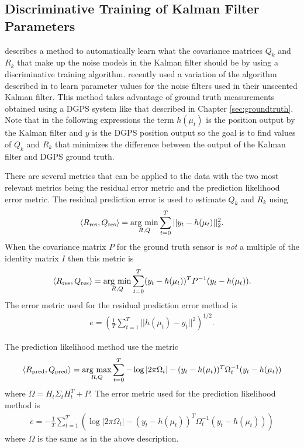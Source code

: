\subsection{Discriminative Training of Kalman Filter Parameters}
\label{sec:kftrainingparams}
\cite{Abbeel-RSS-05} describes a method to automatically learn what the covariance matrices $Q_k$ and $R_k$ that make up the noise models in the Kalman filter should be by using a discriminative training algorithm. \cite{SakaiKuroda10} recently used a variation of the algorithm described in \cite{Abbeel-RSS-05} to learn parameter values for the noise filters used in their unscented Kalman filter. This method takes advantage of ground truth measurements obtained using a DGPS system like that described in Chapter \ref{sec:groundtruth}. Note that in the following expressions the term $h(\mu_t)$ is the position output by the Kalman filter and $y$ is the DGPS position output so the goal is to find values of $Q_k$ and $R_k$ that minimizes the difference between the output of the Kalman filter and DGPS ground truth.

There are several metrics that can be applied to the data with the two most relevant metrics being the residual error metric and the prediction likelihood error metric. The residual prediction error is used to estimate $Q_k$ and $R_k$ using
\begin{align*}
\left<R_{\text{res}},Q_{\text{res}}\right> = \mathop{\arg\,\min}\limits_{R,Q}\sum_{t=0}^T ||y_t-h(\mu_t)||_2^2.
\end{align*}
When the covariance matrix $P$ for the ground truth sensor is \textit{not} a multiple of the identity matrix $I$ then this metric is
\begin{align*}
\left<R_{\text{res}},Q_{\text{res}}\right> = \mathop{\arg\,\min}\limits_{R,Q}\sum_{t=0}^T (y_t-h(\mu_t))^TP^{-1}(y_t-h(\mu_t)).
\end{align*}
The error metric used for the residual prediction error method is
\begin{align}
\label{eq:kftrainingres}
e = \left(\frac{1}{T}\sum_{t=1}^T ||h(\mu_t)-y_t||^2\right)^{1/2}.
\end{align}

The prediction likelihood method use the metric
\begin{align*}
\left<R_{\text{pred}},Q_{\text{pred}}\right> = \mathop{\arg\,\max}\limits_{R,Q}\sum_{t=0}^T -\log|2\pi\Omega_t| - (y_t-h(\mu_t))^T\Omega_t^{-1}(y_t-h(\mu_t))
\end{align*}
where $\Omega = H_t\Sigma_tH_t^T+P$. The error metric used for the prediction likelihood method is
\begin{align}
\label{eq:kftrainingpred}
e = -\frac{1}{T}\sum_{t=1}^T \left(\log|2\pi\Omega_t| - (y_t-h(\mu_t))^T\Omega_t^{-1}(y_t-h(\mu_t))\right)
\end{align}
where $\Omega$ is the same as in the above description.

